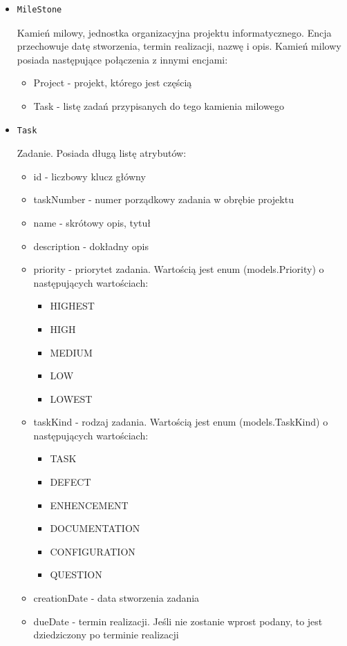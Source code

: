 \documentclass[a4paper,12pt,notitlepage]{mwrep}
\begin{document}
\begin{itemize}
	\item	\begin{verbatim}MileStone\end{verbatim} Kamień milowy, jednostka organizacyjna projektu informatycznego. Encja przechowuje datę stworzenia, 
		termin realizacji, nazwę i opis. Kamień milowy posiada następujące połączenia z innymi encjami:
		\begin{itemize}
			\item	Project - projekt, którego jest częścią
			\item	Task - listę zadań przypisanych do tego kamienia milowego
		\end{itemize}

	\item	\begin{verbatim}Task\end{verbatim} Zadanie. Posiada długą listę atrybutów:
		\begin{itemize}
			\item	id - liczbowy klucz główny
			\item	taskNumber - numer porządkowy zadania w obrębie projektu
			\item	name - skrótowy opis, tytuł
			\item	description - dokładny opis
			\item	priority - priorytet zadania. Wartością jest enum (models.Priority) o następujących wartościach:
			\begin{itemize}
				\item	HIGHEST
				\item	HIGH
				\item	MEDIUM
				\item	LOW
				\item	LOWEST
			\end{itemize}
			\item	taskKind - rodzaj zadania. Wartością jest enum (models.TaskKind) o następujących wartościach:
			\begin{itemize}
				\item	TASK
				\item	DEFECT
				\item	ENHENCEMENT
				\item	DOCUMENTATION
				\item	CONFIGURATION
				\item	QUESTION
			\end{itemize}
			\item	creationDate - data stworzenia zadania
			\item	dueDate - termin realizacji. Jeśli nie zostanie wprost podany, to jest dziedziczony po terminie realizacji 

\end{itemize}
\end{itemize}
\end{document}

